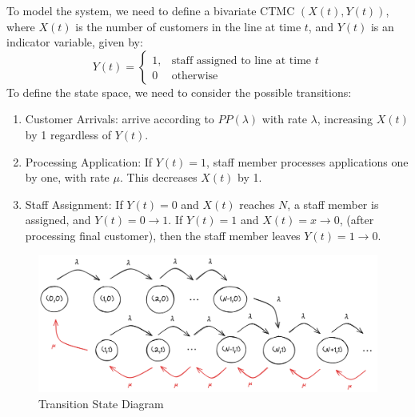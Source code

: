 \documentclass[12pt]{article}
\begin{document}
To model the system, we need to define a bivariate CTMC $(X(t), Y(t))$, where $X(t)$ is the number of customers in the line at time $t$, and $Y(t)$ is an indicator variable, given by: \begin{equation}
    Y(t) = \begin{cases}
        1, & \text{staff assigned to line at time } t \\ 
        0 & \text{otherwise}
    \end{cases}
\end{equation} To define the state space, we need to consider the possible transitions: \begin{enumerate}
    \item Customer Arrivals: arrive according to $PP(\lambda)$ with rate $\lambda$, increasing $X(t)$ by 1 regardless of $Y(t)$. 
    \item Processing Application: If $Y(t) = 1$, staff member processes applications one by one, with rate $\mu$. This decreases $X(t)$ by 1. 
    \item Staff Assignment: If $Y(t) = 0$ and $X(t)$ reaches $N$, a staff member is assigned, and $Y(t) = 0 \to 1$. If $Y(t) = 1$ and $X(t) = x \to 0$, (after processing final customer), then the staff member leaves $Y(t) = 1 \to 0$.
\end{enumerate}

\begin{figure}[H]
    \centering
    \includegraphics[width=\textwidth]{Images/Q3.png}
    \caption{Transition State Diagram}
    \label{fig:3-tsd}
\end{figure} 
\end{document}
